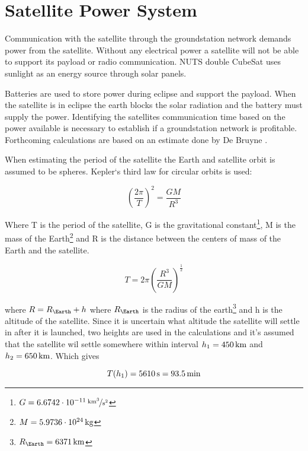 \section{Satellite Power System}

Communication with the satellite through the groundstation network demands power from the satellite. Without any electrical power a satellite will not be able to support its payload or radio communication. NUTS double CubeSat uses sunlight as an energy source through solar panels. 

Batteries are used to store power during eclipse and support the payload. When the satellite is in eclipse the earth blocks the solar radiation and the battery must supply the power. Identifying the satellites communication time based on the power available is necessary to establish if a groundstation network is profitable. Forthcoming calculations are based on an estimate done by De Bruyne \cite{Satellite Power Systems}.

When estimating the period of the satellite the Earth and satellite orbit is assumed to be spheres. Kepler`s third law for circular orbits is used:

\begin{equation}
\left(\frac{2\pi}{T}\right)^2 = \frac{GM}{R^3}
\label{eq:Keplers_3}
\end{equation}

Where T is the period of the satellite, G is the gravitational constant\footnote{$G=\unitfrac[6.6742\cdot 10^{-11}]{km^3}{s^2}$}, M is the mass of the Earth\footnote{$M=\unit[5.9736\cdot 10^{24}]{kg}$} and R is the distance between the centers of mass of the Earth and the satellite.

\begin{equation}
T = 2\pi \left(\frac{R^3}{GM}\right)^{\frac{1}{2}}
\label{eq:satellite_period}
\end{equation}

where $R = R_\Earth + h$ where $R_\Earth$ is the radius of the earth\footnote{$R_\Earth = \unit[6371]{km}$} and h is the altitude of the satellite. 
Since it is uncertain what altitude the satellite will settle in after it is launched, two heights are used in the calculations and it's assumed that the satellite wil settle somewhere within interval $h_1=\unit[450]{km}$ and $h_2=\unit[650]{km}$. 
Which gives

\begin{equation}
T(h_1) = \unit[5610]{s} = \unit[93.5]{min}
\end{equation}

